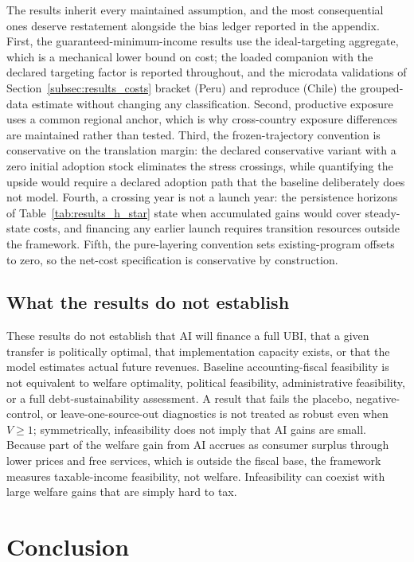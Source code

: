 \documentclass[11pt,a4paper]{article}
\begin{document}
The results inherit every maintained assumption, and the most consequential ones deserve
restatement alongside the bias ledger reported in the
appendix. First, the guaranteed-minimum-income results use the ideal-targeting aggregate,
which is a mechanical lower bound on cost; the loaded companion with the declared targeting
factor is reported throughout, and the microdata validations of Section~\ref{subsec:results_costs} bracket
(Peru) and reproduce (Chile) the grouped-data estimate without changing any
classification. Second, productive exposure uses a common regional anchor, which
is why cross-country exposure differences are maintained rather than tested. Third, the
frozen-trajectory convention is conservative on the translation margin: the declared
conservative variant with a zero initial adoption stock eliminates the stress crossings,
while quantifying the upside would require a declared adoption path that the baseline
deliberately does not model. Fourth, a crossing year is not a launch year: the persistence
horizons of Table~\ref{tab:results_h_star} state when accumulated gains would cover
steady-state costs, and financing any earlier launch requires transition resources outside
the framework. Fifth, the pure-layering convention sets existing-program offsets to zero,
so the net-cost specification is conservative by construction.

\subsection{What the results do not establish}

These results do not establish that AI will finance a full UBI, that a given transfer is politically optimal, that implementation capacity exists, or that the model estimates actual future revenues. Baseline accounting-fiscal feasibility is not equivalent to welfare optimality, political feasibility, administrative feasibility, or a full debt-sustainability assessment. A result that fails the placebo, negative-control, or leave-one-source-out diagnostics is not treated as robust even when $V\geq1$; symmetrically, infeasibility does not imply that AI gains are small. Because part of the welfare gain from AI accrues as consumer surplus through lower prices and free services, which is outside the fiscal base, the framework measures taxable-income feasibility, not welfare. Infeasibility can coexist with large welfare gains that are simply hard to tax.

\section{Conclusion}\label{sec:conclusion}
\end{document}
